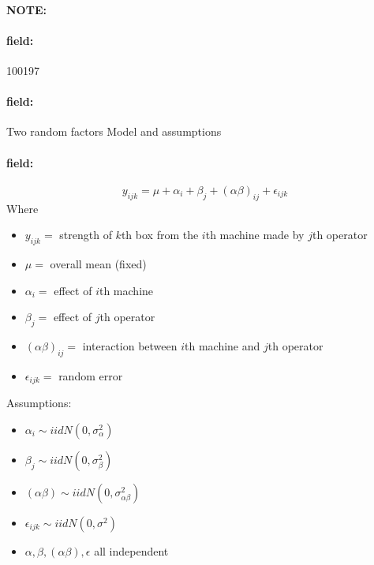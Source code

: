 \documentclass[12pt]{article}
\newenvironment{note}{\paragraph{NOTE:}}{}
\newenvironment{field}{\paragraph{field:}}{}
\begin{document}
\begin{note}
    \begin{field}
        \tiny 100197
    \end{field}
    \begin{field}
        Two random factors Model and assumptions
    \end{field}
    \begin{field}
        $$y_{ijk} = \mu + \alpha_i + \beta_j + (\alpha\beta)_{ij} + \epsilon_{ijk} $$
        Where
        \begin{itemize}
          \item $y_{ijk} = $ strength of $k$th box from the $i$th machine made by $j$th operator
          \item $\mu = $ overall mean (fixed)
          \item $\alpha_i = $ effect of $i$th machine
          \item $\beta_j  =$ effect of $j$th operator
          \item $(\alpha\beta)_{ij} = $ interaction between $i$th machine and $j$th operator
          \item $\epsilon_{ijk} = $ random error
        \end{itemize}
        Assumptions:
        \begin{itemize}
          \item $\alpha_i \sim iid N(0,\sigma_\alpha^2)$
          \item $\beta_j \sim iid N(0,\sigma_\beta^2)$
          \item $(\alpha\beta) \sim iid N(0,\sigma_{\alpha\beta}^2)$
          \item $\epsilon_{ijk} \sim iid N(0,\sigma^2)$
          \item $\alpha,\beta,(\alpha\beta),\epsilon$ all independent
        \end{itemize}
    \end{field}
\end{note}
\end{document}
